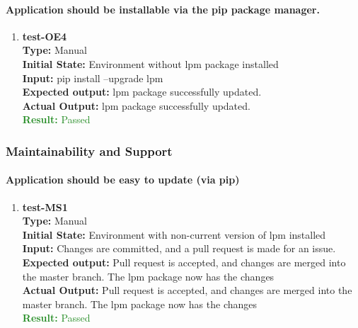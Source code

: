 \documentclass[12pt, titlepage]{article}
\begin{document}
\paragraph{Application should be installable via the pip package manager.}
\begin{enumerate}
    \item{\textbf{test-OE4}\\}
    \textbf{Type:} Manual\\
    \textbf{Initial State:} Environment without lpm package installed\\
    \textbf{Input:} pip install --upgrade lpm\\
    \textbf{Expected output: } lpm package successfully updated.\\
    \textbf{Actual Output:} lpm package successfully updated.\\
    \textcolor{ForestGreen}{\textbf{Result:} Passed}
\end{enumerate}

\subsubsection{Maintainability and Support}
\paragraph{Application should be easy to update (via pip)}
\begin{enumerate}
    \item{\textbf{test-MS1}\\}
    \textbf{Type:} Manual\\
    \textbf{Initial State:} Environment with non-current version of lpm installed\\
    \textbf{Input:} Changes are committed, and a pull request is made for an issue.\\
    \textbf{Expected output: } Pull request is accepted, and changes are merged into the master branch. The lpm package now has the changes\\
    \textbf{Actual Output:} Pull request is accepted, and changes are merged into the master branch. The lpm package now has the changes\\
    \textcolor{ForestGreen}{\textbf{Result:} Passed}
\end{enumerate}
\end{document}
